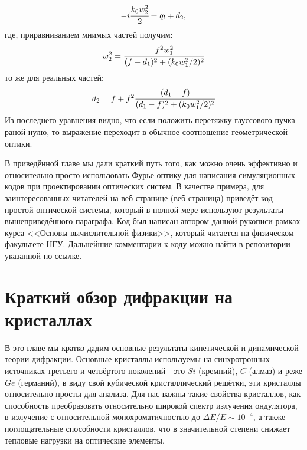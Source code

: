 \documentclass[14pt,a4paper]{extarticle}
\numberwithin{equation}{section}
\begin{document}
\begin{equation}
	-i\cfrac{k_0w^2_2}{2} = q_l + d_2, 
\end{equation}
где, приравниванием мнимых частей получим: 
\begin{equation}
	w^2_2 = \cfrac{f^2w^2_1}{(f - d_1)^2 + (k_0w^2_1/2)^2}
\end{equation}
то же для реальных частей: 
\begin{equation}
	d_2 = f + f^2\cfrac{(d_1 - f)}{(d_1 - f)^2 + (k_0w^2_1/2)^2}
\end{equation}
Из последнего уравнения видно, что если положить перетяжку гауссового пучка раной нулю, то выражение переходит в обычное соотношение геометрической оптики.

В приведённой главе мы дали краткий путь того, как можно очень эффективно и относительно просто использовать Фурье оптику для написания симуляционных кодов при проектировании оптических систем. В качестве примера, для заинтересованных читателей на веб-странице (веб-страница) приведёт код простой оптической системы, который в полной мере используют результаты вышеприведённого параграфа. Код был написан автором данной рукописи рамках курса <<Основы вычислительной физики>>, который читается на физическом факультете НГУ. Дальнейшие комментарии к коду можно найти в репозитории указанной по ссылке.
\section{Краткий обзор дифракции на кристаллах}
В это главе мы кратко дадим основные результаты кинетической и динамической теории дифракции. Основные кристаллы используемы на синхротронных источниках третьего и четвёртого поколений - это $Si$ (кремний), $C$ (алмаз) и реже $Ge$ (германий), в виду свой кубической кристаллический решётки, эти кристаллы относительно просты для анализа. Для нас важны такие свойства кристаллов, как способность преобразовать относительно широкой спектр излучения ондулятора, в излучение с относительной монохроматичностью до $\Delta E/ E \sim 10^{-4}$, а также поглощательные способности кристаллов, что в значительной степени снижает тепловые нагрузки на оптические элементы.
\end{document}
